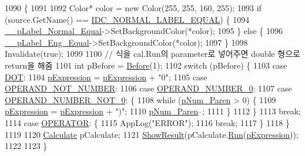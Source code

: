 \begin{DoxyCode}
1090                                                 \{
1091 
1092     Color* color = \textcolor{keyword}{new} Color(255, 255, 160, 255);
1093     \textcolor{keywordflow}{if} (source.GetName() == \hyperlink{_app_resource_id_8h_a5629b412ef5739896e1ad934765bfef3}{IDC\_NORMAL\_LABEL\_EQUAL}) \{
1094         \hyperlink{class_calculator_form_ae9a8c51bc39c7ec66a7e43f6c29a14d8}{\_\_pLabel\_Normal\_Equal}->SetBackgroundColor(*color);
1095     \} \textcolor{keywordflow}{else} \{
1096         \hyperlink{class_calculator_form_a57055baa16d93e319c193d01bf833bc7}{\_\_pLabel\_Eng\_Equal}->SetBackgroundColor(*color);
1097     \}
1098     Invalidate(\textcolor{keyword}{true});
1099 
1100 \textcolor{comment}{// 식을 cal.Run의 parameter로 넣어주면 double 형으로 return을 해줌}
1101     \textcolor{keywordtype}{int} pBefore = \hyperlink{class_calculator_form_af8fd474cf2173be9fa0dbbdfc114b5b3}{Before}(1);
1102     \textcolor{keywordflow}{switch} (pBefore) \{
1103     \textcolor{keywordflow}{case} \hyperlink{_calculator_form_8cpp_a5f2b2f460e2ebcf757c348d74ed9ef68}{DOT}:
1104         \hyperlink{_calculator_form_8cpp_a8e641e0c730e6831fcb8e9caf57f5285}{pExpression} = \hyperlink{_calculator_form_8cpp_a8e641e0c730e6831fcb8e9caf57f5285}{pExpression} + \textcolor{stringliteral}{"0"};
1105     \textcolor{keywordflow}{case} \hyperlink{_calculator_form_8cpp_a310731b27bb8f16b0f5fdfeae1f7ffb5}{OPERAND\_NOT\_NUMBER}:
1106     \textcolor{keywordflow}{case} \hyperlink{_calculator_form_8cpp_ace8ca5226379bd4e27e83a4fa65b4730}{OPERAND\_NUMBER\_0}:
1107     \textcolor{keywordflow}{case} \hyperlink{_calculator_form_8cpp_a1f5ddbd63e4020c3e1ab02f2a8a272ea}{OPERAND\_NUMBER\_NOT\_0}: \{
1108         \textcolor{keywordflow}{while} (\hyperlink{_calculator_form_8cpp_a5a03127e257bb5f5d935e038dcf8d834}{pNum\_Paren} > 0) \{
1109             \hyperlink{_calculator_form_8cpp_a8e641e0c730e6831fcb8e9caf57f5285}{pExpression} = \hyperlink{_calculator_form_8cpp_a8e641e0c730e6831fcb8e9caf57f5285}{pExpression} + \textcolor{stringliteral}{")"};
1110             \hyperlink{_calculator_form_8cpp_a5a03127e257bb5f5d935e038dcf8d834}{pNum\_Paren}--;
1111         \}
1112     \}
1113         \textcolor{keywordflow}{break};
1114     \textcolor{keywordflow}{case} \hyperlink{_calculator_form_8cpp_a197d8d1c652619a50380202a7c4c722c}{OPERATOR}: \{
1115         AppLog(\textcolor{stringliteral}{"ERROR"});
1116         \textcolor{keywordflow}{break};
1117     \}
1118     \}
1119 
1120     \hyperlink{class_calculate}{Calculate} pCalculate;
1121     \hyperlink{class_calculator_form_af9b618f4e52e683e4af58fbd6c0d9f1b}{ShowResult}(pCalculate.\hyperlink{class_calculate_a0ad76f7ee31bea1dec46e560d10fca75}{Run}(\hyperlink{_calculator_form_8cpp_a8e641e0c730e6831fcb8e9caf57f5285}{pExpression}));
1122 
1123 \}
\end{DoxyCode}


